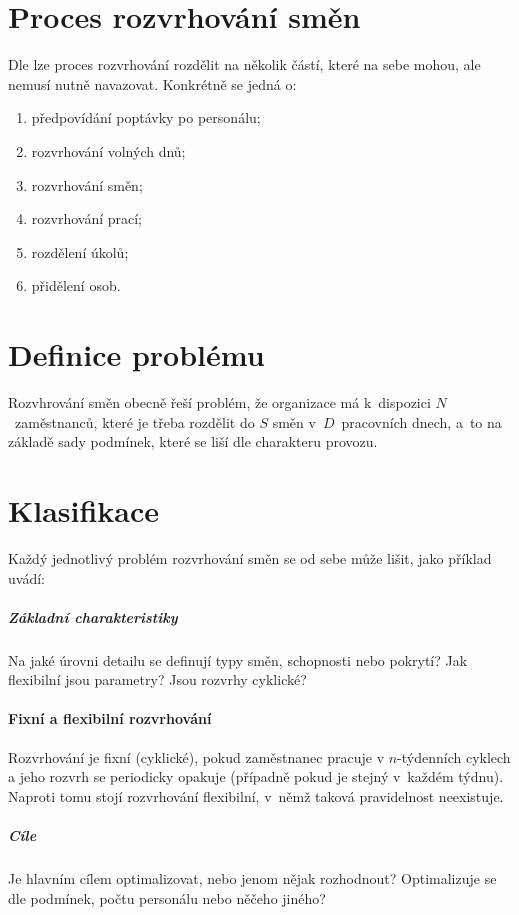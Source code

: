 \documentclass[twoside]{ctuthesis}
\begin{document}
\begin{enumerate}[label=\textbf{O\arabic*.}]
\section{Proces rozvrhování směn}
Dle \cite{ernst2004staff} lze proces rozvrhování rozdělit na několik částí, které na sebe mohou, ale nemusí nutně navazovat. Konkrétně se jedná o:
\begin{enumerate}
	\item předpovídání poptávky po personálu;
	\item rozvrhování volných dnů;
	\item rozvrhování směn;
	\item rozvrhování prací;
	\item rozdělení úkolů;
	\item přidělení osob.
\end{enumerate}

\section{Definice problému}

Rozvhrování směn obecně řeší problém, že organizace má k~dispozici $N$~zaměstnanců, které je třeba rozdělit do $S$ směn v~$D$~pracovních dnech, a~to na základě sady podmínek, které se liší dle charakteru provozu.

\section{Klasifikace}
\label{sec:clasif}

Každý jednotlivý problém rozvrhování směn se od sebe může lišit, \cite{de2011categorisation} jako příklad uvádí:

\subparagraph{Základní charakteristiky}
Na jaké úrovni detailu se definují typy směn, schopnosti nebo pokrytí? Jak flexibilní jsou parametry? Jsou rozvrhy cyklické?

\paragraph{Fixní a flexibilní rozvrhování}
Rozvrhování je fixní (cyklické), pokud zaměstnanec pracuje v $n$-týdenních cyklech a jeho rozvrh se periodicky opakuje (případně pokud je stejný v~každém týdnu). Naproti tomu stojí rozvrhování flexibilní, v~němž taková pravidelnost neexistuje. \cite{burke2004state}

\subparagraph{Cíle}
Je hlavním cílem optimalizovat, nebo jenom nějak rozhodnout? Optimalizuje se dle podmínek, počtu personálu nebo něčeho jiného?


\end{enumerate}
\end{document}
